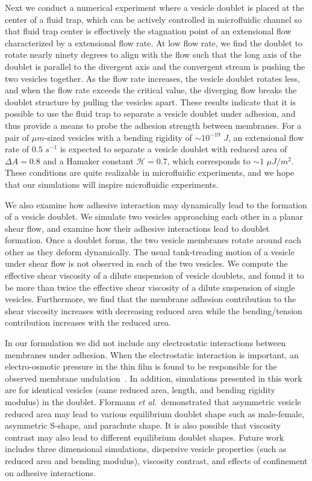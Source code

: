 \documentclass[prf,superscriptaddress,showkeys]{revtex4-1}
\begin{document}
Next we conduct a numerical experiment where a vesicle doublet is placed
at the center of a fluid trap, which can be actively controlled in
microfluidic channel so that fluid trap center is effectively the
stagnation point of an extensional flow characterized by a extensional
flow rate.  At low flow rate, we find the doublet to rotate nearly
ninety degrees to align with the flow such that the long axis of the
doublet is parallel to the divergent axis and the convergent stream is
pushing the two vesicles together. As the flow rate increases, the
vesicle doublet rotates less, and when the flow rate exceeds the
critical value, the diverging flow breaks the doublet structure by
pulling the vesicles apart.  These results indicate that it is possible
to use the fluid trap to separate a vesicle doublet under adhesion, and
thus provide a means to probe the adhesion strength between membranes.
For a pair of $\mu m$-sized vesicles with a bending rigidity of $\sim
10^{-19}$ $J$, an extensional flow rate of $0.5$ $s^{-1}$ is expected to
separate a vesicle doublet with reduced area of $\Delta A = 0.8$ and a
Hamaker constant $\mathcal{H}=0.7$, which corresponds to $\sim 1$ $\mu
J/m^2$.  These conditions are quite realizable in microfluidic
experiments, and we hope that our simulations will inspire microfluidic
experiments.

We also examine how adhesive interaction may dynamically lead to the
formation of a vesicle doublet.  We simulate two vesicles approaching
each other in a planar shear flow, and examine how their adhesive
interactions lead to doublet formation.  Once a doublet forms, the two
vesicle membranes rotate around each other as they deform dynamically.
The usual tank-treading motion of a vesicle under shear flow is not
observed in each of the two vesicles. We compute the effective shear
viscosity of a dilute suspension of vesicle doublets, and found it to be
more than twice the effective shear viscosity of a dilute suspension of
single vesicles.  Furthermore, we find that the membrane adhesion
contribution to the shear viscosity increases with decreasing reduced
area while the bending/tension contribution increases with the reduced
area.

In our formulation we did not include any electrostatic interactions
between membranes under adhesion. When the electrostatic interaction is
important, an electro-osmotic pressure in the thin film is found to be
responsible for the observed membrane
undulation~\cite{SteinkuhlerAgudo-Canalejo2016_BJ}.  In addition,
simulations presented in this work are for identical vesicles (same
reduced area, length, and bending rigidity modulus) in the doublet.
Flormann {\em et al.}~demonstrated that asymmetric vesicle reduced area
may lead to various equilibrium doublet shape such as male-female,
asymmetric S-shape, and parachute shape.  It is also possible that
viscosity contrast may also lead to different equilibrium doublet
shapes.  Future work includes three dimensional simulations, dispersive
vesicle properties (such as reduced area and bending modulus), viscosity
contrast, and effects of confinement on adhesive interactions.
\end{document}
